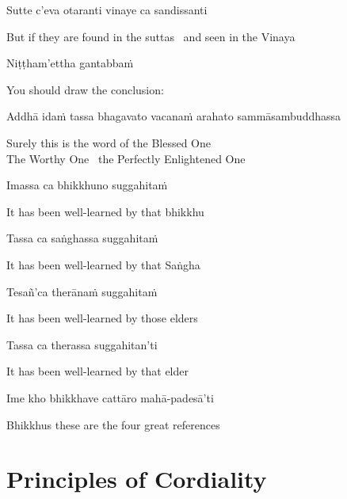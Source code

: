 Sutte c'eva otaranti vinaye ca sandissanti

\begin{english}
  But if they are found in the suttas \breathmark\ and seen in the Vinaya
\end{english}

Niṭṭham'ettha gantabbaṁ

\begin{english}
  You should draw the conclusion:
\end{english}

\begin{pali-hang}
  Addhā idaṁ tassa bhagavato vacanaṁ arahato sammāsambuddhassa
\end{pali-hang}

\begin{english}
  Surely this is the word of the Blessed One\\
  The Worthy One \breathmark\ the Perfectly Enlightened One
\end{english}

Imassa ca bhikkhuno suggahitaṁ

\begin{english}
  It has been well-learned by that bhikkhu
\end{english}

Tassa ca saṅghassa suggahitaṁ

\begin{english}
  It has been well-learned by that Saṅgha
\end{english}

Tesañ'ca therānaṁ suggahitaṁ

\begin{english}
  It has been well-learned by those elders
\end{english}

Tassa ca therassa suggahitan'ti

\begin{english}
  It has been well-learned by that elder
\end{english}

Ime kho bhikkhave cattāro mahā-padesā'ti

\begin{english}
  Bhikkhus these are the four great references
\end{english}

\suttaRef{[AN 4.180]}


\section{Principles of Cordiality}
\label{principles-of-cordiality}

